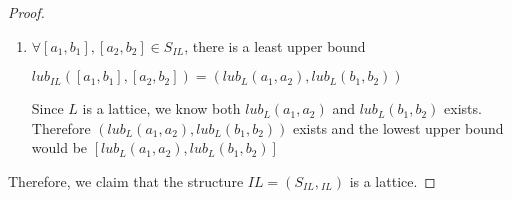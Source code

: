 \begin{proof}
\begin{enumerate}
        \item $\forall [a_1, b_1], [a_2, b_2] \in S_{IL}$, there is a least upper bound
        
        $lub_{IL}([a_1, b_1], [a_2, b_2]) = (lub_L(a_1, a_2), lub_L(b_1, b_2))$

        Since $L$ is a lattice, we know both $lub_L(a_1, a_2)$ and $lub_L(b_1, b_2)$ exists. Therefore $(lub_L(a_1, a_2), lub_L(b_1, b_2))$ exists and the lowest upper bound would be $[lub_L(a_1, a_2), lub_L(b_1, b_2)]$
    \end{enumerate}

    Therefore, we claim that the structure $IL = (S_{IL}, {}_{IL})$ is a lattice.
\end{proof}